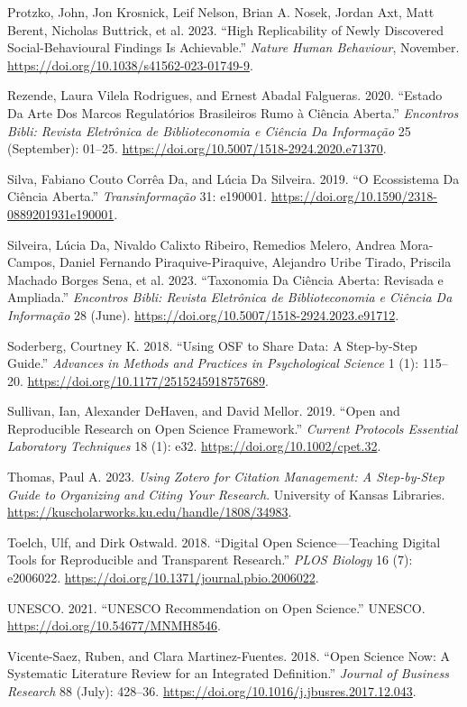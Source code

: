 \documentclass[
  a4paper,
]{article}
\newlength{\cslhangindent}
\newenvironment{CSLReferences}[2] %
 {\begin{list}{}{%
  \setlength{\itemindent}{0pt}
  \setlength{\leftmargin}{0pt}
  \setlength{\parsep}{0pt}
  \ifodd #1
   \setlength{\leftmargin}{\cslhangindent}
   \setlength{\itemindent}{-1\cslhangindent}
  \fi
  \setlength{\itemsep}{#2\baselineskip}}}
 {\end{list}}
\begin{document}
\begin{CSLReferences}{1}{0}
Protzko, John, Jon Krosnick, Leif Nelson, Brian A. Nosek, Jordan Axt,
Matt Berent, Nicholas Buttrick, et al. 2023. {``High Replicability of
Newly Discovered Social-Behavioural Findings Is Achievable.''}
\emph{Nature Human Behaviour}, November.
\url{https://doi.org/10.1038/s41562-023-01749-9}.

Rezende, Laura Vilela Rodrigues, and Ernest Abadal Falgueras. 2020.
{``Estado Da Arte Dos Marcos Regulat{ó}rios Brasileiros Rumo {à}
{Ci{ê}ncia Aberta}.''} \emph{Encontros Bibli: Revista Eletr{ô}nica de
Biblioteconomia e Ci{ê}ncia Da Informa{ç}{ã}o} 25 (September): 01--25.
\url{https://doi.org/10.5007/1518-2924.2020.e71370}.

Silva, Fabiano Couto Corrêa Da, and Lúcia Da Silveira. 2019. {``O
Ecossistema Da {Ci{ê}ncia Aberta}.''} \emph{Transinforma{ç}{ã}o} 31:
e190001. \url{https://doi.org/10.1590/2318-0889201931e190001}.

Silveira, Lúcia Da, Nivaldo Calixto Ribeiro, Remedios Melero, Andrea
Mora-Campos, Daniel Fernando Piraquive-Piraquive, Alejandro Uribe
Tirado, Priscila Machado Borges Sena, et al. 2023. {``Taxonomia Da
{Ci{ê}ncia Aberta}: Revisada e Ampliada.''} \emph{Encontros Bibli:
Revista Eletr{ô}nica de Biblioteconomia e Ci{ê}ncia Da Informa{ç}{ã}o}
28 (June). \url{https://doi.org/10.5007/1518-2924.2023.e91712}.

Soderberg, Courtney K. 2018. {``Using OSF to Share Data: A Step-by-Step
Guide.''} \emph{Advances in Methods and Practices in Psychological
Science} 1 (1): 115--20. \url{https://doi.org/10.1177/2515245918757689}.

Sullivan, Ian, Alexander DeHaven, and David Mellor. 2019. {``Open and
Reproducible Research on Open Science Framework.''} \emph{Current
Protocols Essential Laboratory Techniques} 18 (1): e32.
\url{https://doi.org/10.1002/cpet.32}.

Thomas, Paul A. 2023. \emph{Using Zotero for Citation Management: A
Step-by-Step Guide to Organizing and Citing Your Research}. University
of Kansas Libraries.
\url{https://kuscholarworks.ku.edu/handle/1808/34983}.

Toelch, Ulf, and Dirk Ostwald. 2018. {``Digital Open
Science---{Teaching} Digital Tools for Reproducible and Transparent
Research.''} \emph{PLOS Biology} 16 (7): e2006022.
\url{https://doi.org/10.1371/journal.pbio.2006022}.

UNESCO. 2021. {``{UNESCO Recommendation} on {Open Science}.''} UNESCO.
\url{https://doi.org/10.54677/MNMH8546}.

Vicente-Saez, Ruben, and Clara Martinez-Fuentes. 2018. {``Open {Science}
Now: {A} Systematic Literature Review for an Integrated Definition.''}
\emph{Journal of Business Research} 88 (July): 428--36.
\url{https://doi.org/10.1016/j.jbusres.2017.12.043}.

\end{CSLReferences}
\end{document}
